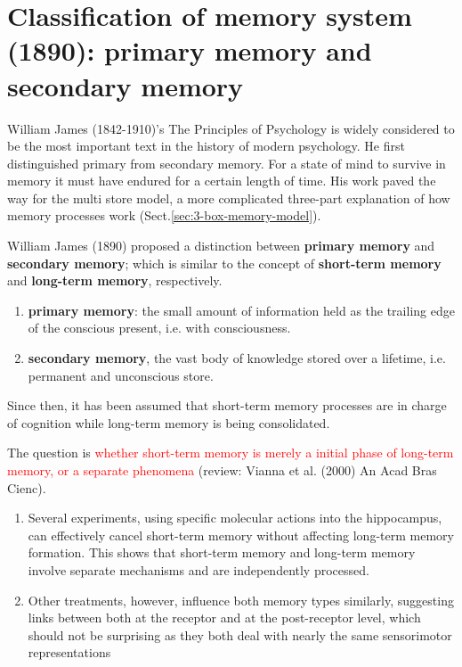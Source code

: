 \section{Classification of memory system (1890): primary memory and secondary memory}
\label{sec:primary-secondary-memory-model}

William James (1842-1910)'s The Principles of Psychology is widely considered to
be the most important text in the history of modern psychology. He first
distinguished primary from secondary memory. For a state of mind to survive in
memory it must have endured for a certain length of time.
His work paved the way for the multi store model, a more complicated three-part
explanation of how memory processes work (Sect.\ref{sec:3-box-memory-model}).


William James (1890) proposed a distinction between {\bf primary memory} and
{\bf secondary memory}; which is similar to the concept of {\bf short-term
memory} and {\bf long-term memory}, respectively.
\begin{enumerate}
  
  \item {\bf primary memory}: the small amount of information held as the
  trailing edge of the conscious present, i.e. with consciousness.
  
  \item {\bf secondary memory}, the vast body of knowledge stored over a
  lifetime, i.e. permanent and unconscious store.
  
\end{enumerate}

Since then, it has been assumed that short-term memory processes are in charge
of cognition while long-term memory is being consolidated.

The question is \textcolor{red}{ whether short-term memory is merely a initial
phase of long-term memory, or a separate phenomena} (review: Vianna et al.
(2000) An Acad Bras Cienc).

\begin{enumerate}

  \item Several experiments, using specific molecular actions into the hippocampus, can
effectively cancel short-term memory without affecting long-term memory
formation. This shows that short-term memory and long-term memory involve
separate mechanisms and are independently processed.

  \item Other treatments, however, influence both memory types similarly,
  suggesting links between both at the receptor and at the post-receptor level,
  which should not be surprising as they both deal with nearly the same
  sensorimotor representations
\end{enumerate}
% 






